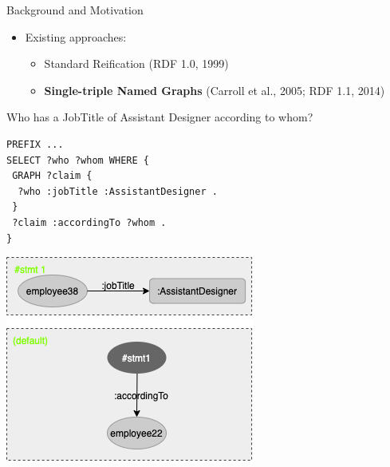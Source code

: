 \documentclass[aspectratio=169]{beamer}
\begin{document}
\begin{frame}[fragile]{Background and Motivation}
    \begin{itemize}
        \item Existing approaches:
            \begin{itemize}
                \item Standard Reification (RDF 1.0, 1999)
                \item \textbf{Single-triple Named Graphs} (Carroll et al., 2005; RDF 1.1, 2014)
            \end{itemize}
    \end{itemize}
        \begin{minipage}{0.56\textwidth}
    \small{Who has a JobTitle of Assistant Designer according to whom?}
\begin{lstlisting}[language=SPARQL]
PREFIX ...
SELECT ?who ?whom WHERE {
 GRAPH ?claim {
  ?who :jobTitle :AssistantDesigner .
 }
 ?claim :accordingTo ?whom .
}
\end{lstlisting}
\end{minipage}
\begin{minipage}{0.43\textwidth}
\centering
	\includegraphics[scale=0.5]{images/Example-2-NamedGraph.png}
\end{minipage}
\end{frame}
\end{document}
